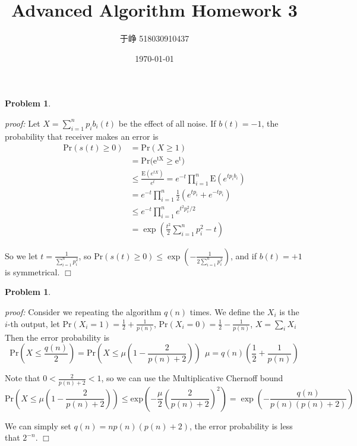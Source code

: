 \documentclass{article}
\title{Advanced Algorithm Homework 3}
\author{于峥 518030910437}
\date{\today}
\newtheorem{problem}[theorem]{Problem}
\newenvironment{solution}{\noindent \textit{proof:}}{$\Box$}
\begin{document}
    \maketitle
    
\begin{problem}
\end{problem}
\begin{solution}
    Let $X = \sum_{i=1}^np_ib_i(t)$ be the effect of all noise.
    If $b(t) = -1$, the probability that receiver makes an error is
    \begin{align*}
    \mathrm{Pr}(s(t) \geq 0) 
    &= \mathrm{Pr}\left(X \geq 1\right) \\
    &= \mathrm{Pr(e^{tX} \geq e^t})  \\
    &\leq \frac {\mathrm{E}(e^{tX})} {e^t} 
    = e^{-t} \prod_{i=1}^n \mathrm{E}(e^{tp_ib_i}) \\
    &= e^{-t} \prod_{i=1}^n \frac 1 2 (e^{tp_i} + e^{-tp_i}) \\
    &\leq e^{-t} \prod_{i=1}^n e^{t^2p_i^2/2} \\
    &= \exp(\frac {t^2} 2\sum_{i=1}^n p_i^2 - t)
    \end{align*}
    
    So we let $t = \frac {1} {\sum_{i=1}^np_i^2}$, so $\mathrm{Pr}(s(t)\geq 0) \leq \exp(-\frac 1 {2\sum_{i=1}^np_i^2})$, and if $b(t) = +1$ is symmetrical.
\end{solution}

\begin{problem} 
\end{problem}
\begin{solution}
    Consider we repeating the algorithm $q(n)$ times. We define the $X_i$ is the $i$-th output, let
    $\mathrm{Pr}(X_i=1) = \frac 1 2 + \frac 1 {p(n)}$,
    $\mathrm{Pr}(X_i=0) = \frac 1 2 - \frac 1 {p(n)}$, $X = \sum_i X_i$ Then the error probability is
    $$
        \mathrm{Pr}\left(X \leq \frac {q(n)} 2\right) = \mathrm{Pr}\left(X \leq \mu \left (1-\frac 2 {p(n)+2}\right)\right) ~~ \mu = q(n) \left(\frac 1 2 + \frac 1 {p(n)}\right)
    $$
    
    Note that $0 < \frac 2 {p(n)+2} < 1$, so we can use the Multiplicative Chernoff bound
    $$
    \mathrm{Pr}\left(X \leq \mu \left (1-\frac 2 {p(n)+2}\right)\right)
    \leq \mathrm{exp} \left( -\frac \mu 2 \left(\frac 2 {p(n)+2} \right)^2 \right)
    = \exp\left(-\frac {q(n)} {p(n)(p(n)+2)}\right)
    $$
    
    We can simply set $q(n) = np(n)(p(n)+2)$, the error probability is less that
    $2^{-n}$.
\end{solution}
\end{document}
